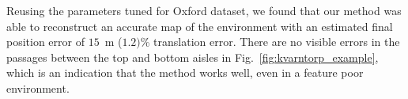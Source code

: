 Reusing the parameters tuned for Oxford dataset, we found that our method was able to reconstruct an accurate map of the environment with an estimated final position error of $15$~m ($1.2)$\% translation error. There are no visible errors in the passages between the top and bottom aisles in Fig.~\ref{fig:kvarntorp_example}, which is an indication that the method works well, even in a feature poor environment.




%

